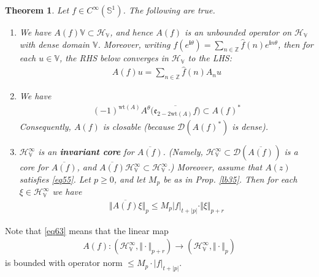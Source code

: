 \documentclass[12pt,b5paper,notitlepage]{article}
\theoremstyle{definition}
\theoremstyle{plain}
\newtheorem{thm}[df]{Theorem}
\newcommand{\wht}{\widehat}
\newcommand{\ovl}{\overline}
\newcommand{\Dom}{\scr{D}}
\newcommand{\scr}{\mathscr}
\newcommand{\im}{\mathbf{i}}
\newcommand{\Vbb}{\mathbb V}
\newcommand{\Zbb}{\mathbb Z}
\newcommand{\wt}{\mathrm{wt}}
\newcommand{\Sbb}{{\mathbb S}}
\newcommand{\HV}{\mathcal H_{\mathbb V}}
\newcommand{\ek}{\mathfrak{e}}
\numberwithin{equation}{section}
\begin{document}
\begin{thm}\label{lb39}
Let $f\in C^\infty(\Sbb^1)$. The following are true.
\begin{enumerate}[label=(\alph*)]
\item We have $A(f)\Vbb\subset\HV$, and hence $A(f)$ is an unbounded operator on $\HV$ with dense domain $\Vbb$. Moreover, writing $f(e^{\im\theta})=\sum_{n\in\Zbb}\wht f(n)e^{\im n\theta}$, then for each $u\in\Vbb$, the RHS below converges in $\HV$ to the LHS:
\begin{align}\label{eq59}
A(f)u=\sum_{n\in\Zbb}\wht f(n) A_nu
\end{align}
\item We have
\begin{align}\label{eq62}
(-1)^{\wt(A)}A^\theta\big(\ovl{\ek_{2-2\wt(A)}f}\big)\subset A(f)^*
\end{align}
Consequently, $A(f)$ is closable (because $\Dom(A(f)^*)$ is dense).
\item $\HV^\infty$ is an \textbf{invariant core}  for $\ovl{A(f)}$. (Namely, $\HV^\infty\subset \Dom(\ovl{A(f)})$ is a core for $\ovl{A(f)}$, and $\ovl{A(f)}\HV^\infty\subset\HV^\infty$.) Moreover, assume that $A(z)$ satisfies \eqref{eq55}. Let $p\geq0$, and let $M_p$ be as in Prop. \ref{lb35}. Then for each $\xi\in\HV^\infty$  we have
\begin{align}\label{eq63}
\Vert \ovl{A(f)}\xi\Vert_p\leq M_p|f|_{t+|p|}\cdot \Vert \xi\Vert_{p+r}
\end{align}
\end{enumerate}
\end{thm}

Note that \eqref{eq63} means that the linear map
\begin{align}
A(f):(\HV^\infty,\Vert\cdot\Vert_{p+r})\rightarrow (\HV^\infty,\Vert\cdot\Vert_p)
\end{align}
is bounded with operator norm $\leq M_p\cdot |f|_{t+|p|}$.
\end{document}
